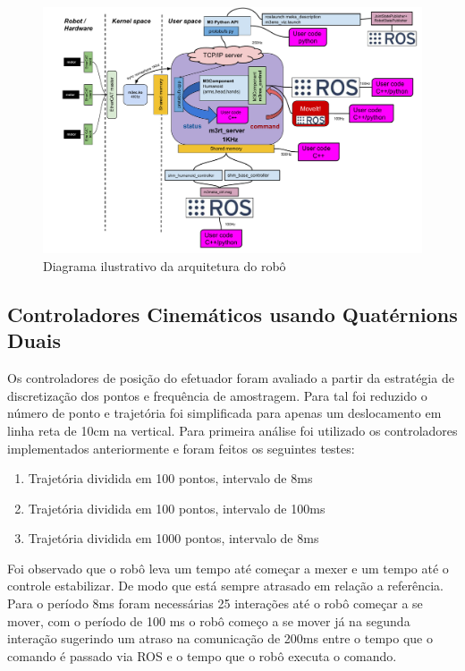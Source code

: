 \begin{figure}[H]
    \centering
    \includegraphics[width=\linewidth]{figs/m3_arch.pdf}
    \caption{Diagrama ilustrativo da arquitetura do robô}
    \label{fig:m3arch}
\end{figure}

\subsection{Controladores Cinemáticos usando Quatérnions Duais}

Os controladores de posição do efetuador foram avaliado a partir da estratégia de discretização dos pontos e frequência de amostragem. Para tal foi reduzido o número de ponto e trajetória foi simplificada para apenas um deslocamento em linha reta de 10cm na vertical. Para primeira análise foi utilizado os controladores implementados anteriormente e foram feitos os seguintes testes:

\begin{enumerate}
    \item Trajetória dividida em 100 pontos, intervalo de 8ms
    \item Trajetória dividida em 100 pontos, intervalo de 100ms
    \item Trajetória dividida em 1000 pontos, intervalo de 8ms
\end{enumerate}

Foi observado que o robô leva um tempo até começar a mexer e um tempo até o controle estabilizar. De modo que está sempre atrasado em relação a referência. Para o período 8ms foram necessárias 25 interações até o robô começar a se mover, com o período de 100 ms o robô começo a se mover já na segunda interação sugerindo um atraso na comunicação de 200ms entre o tempo que o comando é passado via ROS e o tempo que o robô executa o comando.

